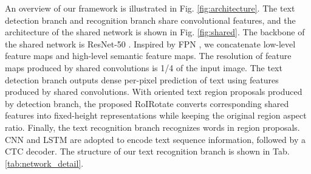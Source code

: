 \documentclass[10pt,twocolumn,letterpaper]{article}
\begin{document}
An overview of our framework is illustrated in Fig. \ref{fig:architecture}. The text detection branch and recognition branch share convolutional features, and the architecture of the shared network is shown in Fig. \ref{fig:shared}. The backbone of the shared network is ResNet-50 \cite{he2016resnet}. Inspired by FPN \cite{lin2016fpn}, we concatenate low-level feature maps and high-level semantic feature maps. The resolution of feature maps produced by shared convolutions is 1/4 of the input image. The text detection branch outputs dense per-pixel prediction of text using features produced by shared convolutions. With oriented text region proposals produced by detection branch, the proposed RoIRotate converts corresponding shared features into fixed-height representations while keeping the original region aspect ratio. Finally, the text recognition branch recognizes words in region proposals. CNN and LSTM are adopted to encode text sequence information, followed by a CTC decoder. The structure of our text recognition branch is shown in Tab. \ref{tab:network_detail}.
\end{document}
